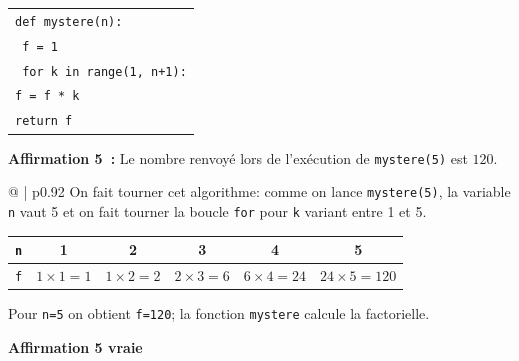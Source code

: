 \begin{enumerate}
\begin{center}
\begin{tabular}{|l|}\hline
\texttt{def mystere(n):}\\
\quad \texttt{ f = 1}\\
\quad \texttt{ for k in range(1, n+1):}\\
\quad \quad \texttt{f = f * k}\\
\quad  \texttt{return f}\\ \hline
\end{tabular}
\end{center}

\textbf{Affirmation 5~:} Le nombre renvoyé lors de l'exécution de \texttt{mystere(5)} est $120$.


\medskip

\begin{tabular}{@{\hspace{0.05\linewidth}} | p{0.92\linewidth}}
On fait tourner cet algorithme: comme on lance \texttt{mystere(5)}, la variable \texttt{n} vaut 5 et on fait tourner la boucle \texttt{for} pour \texttt{k} variant entre 1 et 5.

\begin{center}
\begin{tabular}{| *6{c |} }
\hline
\texttt{n} & 1&2&3&4&5\\
\hline
\texttt{f} & $1\times 1=1$ & $1\times 2=2$ & $2\times 3=6$ & $6 \times 4=24$ & $24\times 5=120$\\
\hline
\end{tabular}
\end{center}

Pour \texttt{n=5} on obtient \texttt{f=120}; la fonction \texttt{mystere} calcule la factorielle.

\hfill \textbf{Affirmation 5 vraie} 
\end{tabular}

\end{enumerate}
